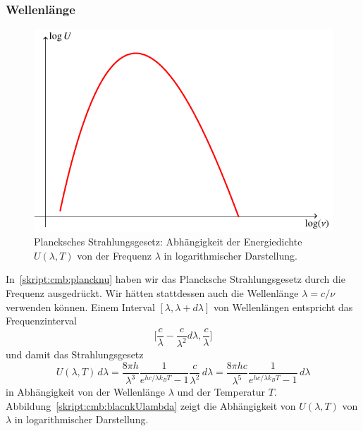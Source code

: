 \subsubsection{Wellenlänge}
\begin{figure}
\centering
\includegraphics{chapters/tikz/planck2.pdf}
\caption{Plancksches Strahlungsgesetz: Abhängigkeit der Energiedichte
$U(\lambda,T)$ von der Frequenz $\lambda$ in logarithmischer Darstellung.
\label{skript:cmb:planckUlambda}}
\end{figure}
In~\eqref{skript:cmb:plancknu} haben wir das Plancksche Strahlungsgesetz
durch die Frequenz ausgedrückt.
Wir hätten stattdessen auch die Wellenlänge $\lambda=c/\nu$ verwenden 
können.
Einem Interval $[\lambda,\lambda+d\lambda]$ von Wellenlängen entspricht
das Frequenzinterval
\[
\biggl[
\frac{c}{\lambda}-\frac{c}{\lambda^2}d\lambda
,
\frac{c}{\lambda}
\biggr]
\]
und damit das Strahlungsgesetz
\begin{equation}
U(\lambda,T)\,d\lambda
=
\frac{8\pi h}{\lambda^3}\frac{1}{e^{hc/\lambda k_BT}-1}\frac{c}{\lambda^2}\,d\lambda
=
\frac{8\pi hc}{\lambda^5}\frac{1}{e^{hc/\lambda k_BT}-1}\,d\lambda
\label{skript:cmb:planck:lambda}
\end{equation}
in Abhängigkeit von der Wellenlänge $\lambda$ und der Temperatur $T$.
Abbildung~\ref{skript:cmb:blacnkUlambda} zeigt die Abhängigkeit von
$U(\lambda,T)$ von $\lambda$ in logarithmischer Darstellung.

